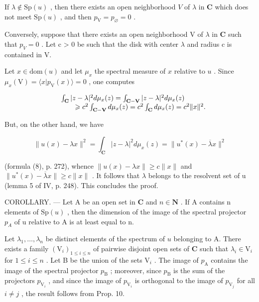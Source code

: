 If \(\lambda \notin \mathrm{Sp}(u)\) , then there exists an open neighborhood \(V\) of \(\lambda\) in \(\mathbf{C}\) which does not meet \(\mathrm{Sp}(u)\) , and then \(p_{\mathrm{V}} = p_{\varnothing} = 0\) .

Conversely, suppose that there exists an open neighborhood V of \(\lambda\) in \(\mathbf{C}\) such that \(p_{V} = 0\) . Let c > 0 be such that the disk with center \(\lambda\) and radius c is contained in V.

Let \(x \in \mathrm{dom}(u)\) and let \(\mu_x\) the spectral measure of \(x\) relative to \(u\) . Since \(\mu_x(\mathrm{V}) = \langle x | p_{\mathrm{V}}(x) \rangle = 0\) , one computes

\[
\begin{array}{r l} & {\int_ {\mathbf {C}} | z - \lambda | ^ {2} d \mu_ {x} (z) = \int_ {\mathbf {C - V}} | z - \lambda | ^ {2} d \mu_ {x} (z)} \\ & {\qquad \geqslant c ^ {2} \int_ {\mathbf {C - V}} d \mu_ {x} (z) = c ^ {2} \int_ {\mathbf {C}} d \mu_ {x} (z) = c ^ {2} \| x \| ^ {2}.} \end{array}
\]

But, on the other hand, we have

\[
\| u (x) - \lambda x \| ^ {2} = \int_ {\mathbf {C}} | z - \lambda | ^ {2} d \mu_ {x} (z) = \| u ^ {*} (x) - \overline {{\lambda}} x \| ^ {2}
\]

(formula (8), p. 272), whence \(\|u(x)-\lambda x\|\geqslant c\|x\|\) and \(\|u^{*}(x)-\overline{\lambda}x\|\geqslant c\|x\|\) . It follows that \(\lambda\) belongs to the resolvent set of u (lemma 5 of IV, p. 248). This concludes the proof.

COROLLARY. — Let A be an open set in \(\mathbf{C}\) and \(n \in \mathbf N\) . If A contains n elements of \(\mathrm{Sp}(u)\) , then the dimension of the image of the spectral projector \(p_{A}\) of u relative to A is at least equal to n.

Let \(\lambda_1, \ldots, \lambda_n\) be distinct elements of the spectrum of \(u\) belonging to A. There exists a family \((\mathrm{V}_i)_{1 \leqslant i \leqslant n}\) of pairwise disjoint open sets of \(\mathbf{C}\) such that \(\lambda_i \in \mathrm{V}_i\) for \(1 \leqslant i \leqslant n\) . Let B be the union of the sets \(\mathrm{V}_i\) . The image of \(p_{\mathrm{A}}\) contains the image of the spectral projector \(p_{\mathrm{B}}\) ; moreover, since \(p_{\mathrm{B}}\) is the sum of the projectors \(p_{\mathrm{V}_i}\) , and since the image of \(p_{\mathrm{V}_i}\) is orthogonal to the image of \(p_{\mathrm{V}_j}\) for all \(i \neq j\) , the result follows from Prop. 10.

